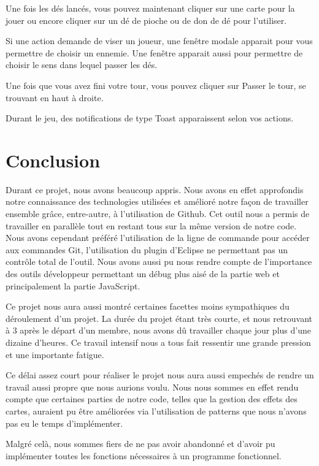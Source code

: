 \documentclass[11pt]{scrreprt}
\begin{document}
    Une fois les dés lancés, vous pouvez maintenant cliquer sur une carte pour la jouer ou encore cliquer sur un dé de pioche ou de don de dé pour l'utiliser.

    Si une action demande de viser un joueur, une fenêtre modale apparait pour vous permettre de choisir un ennemie. Une fenêtre apparait aussi pour permettre de choisir le sens dans lequel passer les dés.

    Une fois que vous avez fini votre tour, vous pouvez cliquer sur \og Passer le tour\fg{}, se trouvant en haut à droite.

    Durant le jeu, des notifications de type Toast apparaissent selon vos actions.

    \chapter{Conclusion}
    Durant ce projet, nous avons beaucoup appris. Nous avons en effet approfondis notre connaissance des technologies utilisées et amélioré notre façon de travailler ensemble grâce, entre-autre, à l'utilisation de Github. Cet outil nous a permis de travailler en parallèle tout en restant tous sur la même version de notre code. Nous avons cependant préféré l'utilisation de la ligne de commande pour accéder aux commandes Git, l'utilisation du plugin d'Eclipse ne permettant pas un contrôle total de l'outil. Nous avons aussi pu nous rendre compte de l'importance des \og outils développeur\fg{} permettant un débug plus aisé de la partie web et principalement la partie JavaScript.

    Ce projet nous aura aussi montré certaines facettes moins sympathiques du déroulement d'un projet. La durée du projet étant très courte, et nous retrouvant à 3 après le départ d'un membre, nous avons dû travailler chaque jour plus d'une dizaine d'heures. Ce travail intensif nous a tous fait ressentir une grande pression et une importante fatigue.

    Ce délai assez court pour réaliser le projet nous aura aussi empechés de rendre un travail aussi propre que nous aurions voulu. Nous nous sommes en effet rendu compte que certaines parties de notre code, telles que la gestion des effets des cartes, auraient pu être améliorées via l'utilisation de patterns que nous n'avons pas eu le temps d'implémenter.

    Malgré celà, nous sommes fiers de ne pas avoir abandonné et d'avoir pu implémenter toutes les fonctions nécessaires à un programme fonctionnel.
\end{document}
